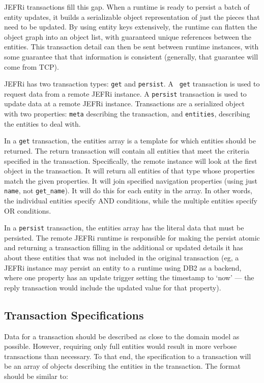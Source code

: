 \documentclass{article}
\newcommand{\ilcode}{\tt}
\begin{document}
JEFRi transactions fill this gap. When a runtime is ready to persist a batch
of entity updates, it builds a serializable object representation of just the
pieces that need to be updated. By using entity keys extensively, the runtime
can flatten the object graph into an object list, with guaranteed unique
references between the entities. This transaction detail can then be sent
between runtime instances, with some guarantee that that information is
consistent (generally, that guarantee will come from TCP).

JEFRi has two transaction types: {\ilcode get} and {\ilcode persist}. A {\ilcode
get} transaction is used to request data from a remote JEFRi instance. A
{\ilcode persist} transaction is used to update data at a remote JEFRi instance.
Transactions are a serialized object with two properties: {\ilcode meta}
describing the transaction, and {\ilcode entities}, describing the entities to
deal with.

In a {\ilcode get} transaction, the entities array is a template for which
entities should be returned. The return transaction will contain all entities
that meet the criteria specified in the transaction. Specifically, the remote
instance will look at the first object in the transaction. It will return all
entities of that type whose
properties match the given properties. It will join specified navigation
properties (using just {\ilcode name}, not {\ilcode get\_name}). It will do this
for each entity in the array. In other words, the individual entities specify
AND conditions, while the multiple entities specify OR conditions.

In a {\ilcode persist} transaction, the entities array has the literal data that must be
persisted. The remote JEFRi runtime is responsible for making the persist atomic
and returning a transaction filling in the additional or updated details it has
about these entities that was not included in the original transaction (eg, a
JEFRi instance may persist an entity to a runtime using DB2 as a backend, where
one property has an update trigger setting the timestamp to `now' --- the reply
transaction would include the updated value for that property).

\subsection{Transaction Specifications}

Data for a transaction should be described as close to the domain model as
possible. However, requiring only full entities would result in more verbose
transactions than necessary. To that end, the specification to a transaction
will be an array of objects describing the entities in the transaction. The
format should be similar to:
\end{document}
